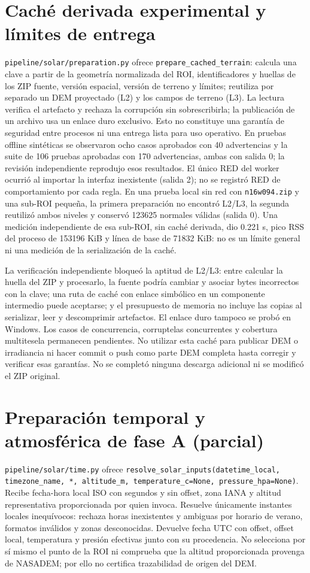 \documentclass[11pt,a4paper]{article}
\begin{document}
\section{Caché derivada experimental y límites de entrega}
\texttt{pipeline/solar/preparation.py} ofrece \texttt{prepare\_cached\_terrain}: calcula una clave a partir de la geometría normalizada del ROI, identificadores y huellas de los ZIP fuente, versión espacial, versión de terreno y límites; reutiliza por separado un DEM proyectado (L2) y los campos de terreno (L3). La lectura verifica el artefacto y rechaza la corrupción sin sobrescribirla; la publicación de un archivo usa un enlace duro exclusivo. Esto no constituye una garantía de seguridad entre procesos ni una entrega lista para uso operativo. En pruebas offline sintéticas se observaron ocho casos aprobados con 40 advertencias y la suite de 106 pruebas aprobadas con 170 advertencias, ambas con salida 0; la revisión independiente reprodujo esos resultados. El único RED del worker ocurrió al importar la interfaz inexistente (salida 2); no se registró RED de comportamiento por cada regla. En una prueba local sin red con \texttt{n16w094.zip} y una sub-ROI pequeña, la primera preparación no encontró L2/L3, la segunda reutilizó ambos niveles y conservó 123625 normales válidas (salida 0). Una medición independiente de esa sub-ROI, sin caché derivada, dio 0.221 s, pico RSS del proceso de 153196 KiB y línea de base de 71832 KiB: no es un límite general ni una medición de la serialización de la caché.

La verificación independiente bloqueó la aptitud de L2/L3: entre calcular la huella del ZIP y procesarlo, la fuente podría cambiar y asociar bytes incorrectos con la clave; una ruta de caché con enlace simbólico en un componente intermedio puede aceptarse; y el presupuesto de memoria no incluye las copias al serializar, leer y descomprimir artefactos. El enlace duro tampoco se probó en Windows. Los casos de concurrencia, corruptelas concurrentes y cobertura multitesela permanecen pendientes. No utilizar esta caché para publicar DEM o irradiancia ni hacer commit o push como parte DEM completa hasta corregir y verificar esas garantías. No se completó ninguna descarga adicional ni se modificó el ZIP original.

\section{Preparación temporal y atmosférica de fase A (parcial)}
\texttt{pipeline/solar/time.py} ofrece \texttt{resolve\_solar\_inputs(datetime\_local, timezone\_name, *, altitude\_m, temperature\_c=None, pressure\_hpa=None)}. Recibe fecha-hora local ISO con segundos y sin offset, zona IANA y altitud representativa proporcionada por quien invoca. Resuelve únicamente instantes locales inequívocos: rechaza horas inexistentes y ambiguas por horario de verano, formatos inválidos y zonas desconocidas. Devuelve fecha UTC con offset, offset local, temperatura y presión efectivas junto con su procedencia. No selecciona por sí mismo el punto de la ROI ni comprueba que la altitud proporcionada provenga de NASADEM; por ello no certifica trazabilidad de origen del DEM.
\end{document}
